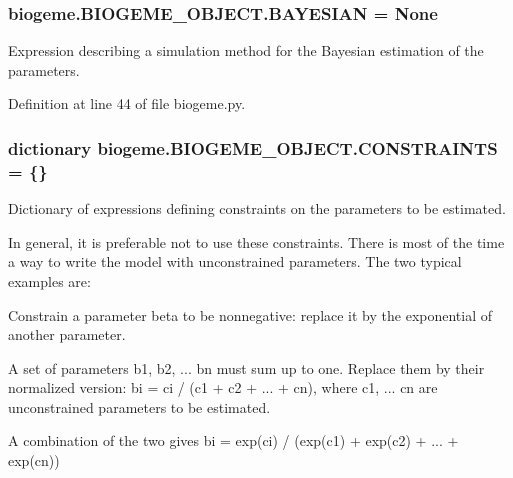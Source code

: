 \subsubsection[{\texorpdfstring{B\+A\+Y\+E\+S\+I\+AN}{BAYESIAN}}]{\setlength{\rightskip}{0pt plus 5cm}biogeme.\+B\+I\+O\+G\+E\+M\+E\+\_\+\+O\+B\+J\+E\+C\+T.\+B\+A\+Y\+E\+S\+I\+AN = None\hspace{0.3cm}{\ttfamily [static]}}\hypertarget{classbiogeme_1_1_b_i_o_g_e_m_e___o_b_j_e_c_t_accb5e1ba6dbea4d40a8eef3f33ac2c8e}{}\label{classbiogeme_1_1_b_i_o_g_e_m_e___o_b_j_e_c_t_accb5e1ba6dbea4d40a8eef3f33ac2c8e}


Expression describing a simulation method for the Bayesian estimation of the parameters. 



Definition at line 44 of file biogeme.\+py.

\subsubsection[{\texorpdfstring{C\+O\+N\+S\+T\+R\+A\+I\+N\+TS}{CONSTRAINTS}}]{\setlength{\rightskip}{0pt plus 5cm}dictionary biogeme.\+B\+I\+O\+G\+E\+M\+E\+\_\+\+O\+B\+J\+E\+C\+T.\+C\+O\+N\+S\+T\+R\+A\+I\+N\+TS = \{\}\hspace{0.3cm}{\ttfamily [static]}}\hypertarget{classbiogeme_1_1_b_i_o_g_e_m_e___o_b_j_e_c_t_a7eb3a18b4249b2ead855e356c2b40ad4}{}\label{classbiogeme_1_1_b_i_o_g_e_m_e___o_b_j_e_c_t_a7eb3a18b4249b2ead855e356c2b40ad4}


Dictionary of expressions defining constraints on the parameters to be estimated. 

In general, it is preferable not to use these constraints. There is most of the time a way to write the model with unconstrained parameters. The two typical examples are\+:
\begin{DoxyItemize}
\item Constrain a parameter beta to be nonnegative\+: replace it by the exponential of another parameter.
\item A set of parameters b1, b2, ... bn must sum up to one. Replace them by their normalized version\+: bi = ci / (c1 + c2 + ... + cn), where c1, ... cn are unconstrained parameters to be estimated.
\item A combination of the two gives bi = exp(ci) / (exp(c1) + exp(c2) + ... + exp(cn)) 
\end{DoxyItemize}


